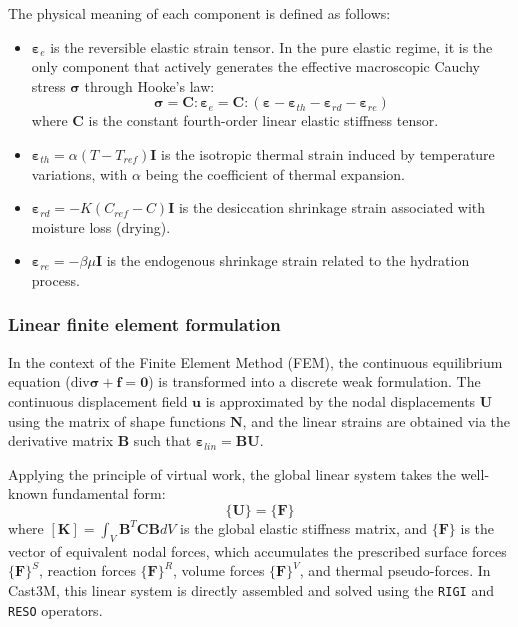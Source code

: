 \documentclass[a4paper,12pt,twoside]{report}     %
\begin{document}
The physical meaning of each component is defined as follows:
\begin{itemize}
    \item $\boldsymbol{\varepsilon}_e$ is the reversible elastic strain tensor. In the pure elastic regime, it is the only component that actively generates the effective macroscopic Cauchy stress $\boldsymbol{\sigma}$ through Hooke's law:
    \begin{equation}
        \boldsymbol{\sigma} = \mathbf{C} : \boldsymbol{\varepsilon}_e = \mathbf{C} : \left( \boldsymbol{\varepsilon} - \boldsymbol{\varepsilon}_{th} - \boldsymbol{\varepsilon}_{rd} - \boldsymbol{\varepsilon}_{re} \right)
    \end{equation}
    where $\mathbf{C}$ is the constant fourth-order linear elastic stiffness tensor.
    \item $\boldsymbol{\varepsilon}_{th} = \alpha(T - T_{ref})\mathbf{I}$ is the isotropic thermal strain induced by temperature variations, with $\alpha$ being the coefficient of thermal expansion.
    \item $\boldsymbol{\varepsilon}_{rd} = -K(C_{ref} - C)\mathbf{I}$ is the desiccation shrinkage strain associated with moisture loss (drying).
    \item $\boldsymbol{\varepsilon}_{re} = -\beta \mu \mathbf{I}$ is the endogenous shrinkage strain related to the hydration process.
\end{itemize}

\subsubsection{Linear finite element formulation}

In the context of the Finite Element Method (FEM), the continuous equilibrium equation ($\text{div} \boldsymbol{\sigma} + \mathbf{f} = \mathbf{0}$) is transformed into a discrete weak formulation. The continuous displacement field $\mathbf{u}$ is approximated by the nodal displacements $\mathbf{U}$ using the matrix of shape functions $\mathbf{N}$, and the linear strains are obtained via the derivative matrix $\mathbf{B}$ such that $\boldsymbol{\varepsilon}_{lin} = \mathbf{B}\mathbf{U}$.

Applying the principle of virtual work, the global linear system takes the well-known fundamental form:
\begin{equation}
    [\mathbf{K}]\{\mathbf{U}\} = \{\mathbf{F}\}
\end{equation}
where $[\mathbf{K}] = \int_V \mathbf{B}^T \mathbf{C} \mathbf{B} dV$ is the global elastic stiffness matrix, and $\{\mathbf{F}\}$ is the vector of equivalent nodal forces, which accumulates the prescribed surface forces $\{\mathbf{F}\}^S$, reaction forces $\{\mathbf{F}\}^R$, volume forces $\{\mathbf{F}\}^V$, and thermal pseudo-forces. In Cast3M, this linear system is directly assembled and solved using the \texttt{RIGI} and \texttt{RESO} operators.
\end{document}
